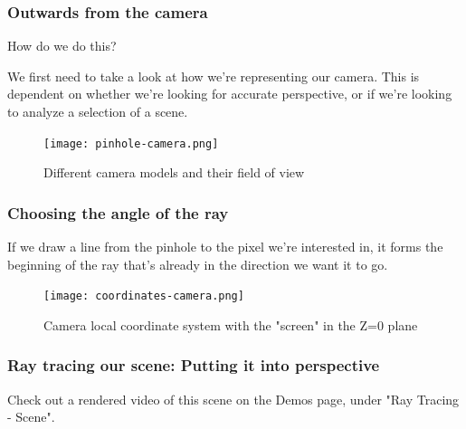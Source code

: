 \documentclass[12pt]{beamer}
\begin{document}
  \begin{frame}
    \frametitle{Outwards from the camera}

    How do we do this?

    We first need to take a look at how we're representing our camera.
    This is dependent on whether we're looking for accurate perspective, or if we're looking to analyze a selection of a scene.



    \begin{figure}
      \centering
      \texttt{[image: pinhole-camera.png]}
      \caption{Different camera models and their field of view}\label{fig:camera-models}
    \end{figure}

  \end{frame}

  \begin{frame}
    \frametitle{Choosing the angle of the ray}

    If we draw a line from the pinhole to the pixel we're interested in, it forms the beginning of the ray that's already in the direction we want it to go.

    \begin{figure}
      \centering
      \texttt{[image: coordinates-camera.png]}
      \caption{Camera local coordinate system with the "screen" in the Z=0 plane}\label{fig:camera-coordinates}
    \end{figure}



  \end{frame}

  \begin{frame}
    \frametitle{Ray tracing our scene: Putting it into perspective}



    Check out a rendered video of this scene on the Demos page, under "Ray Tracing - Scene".

  \end{frame}
\end{document}
